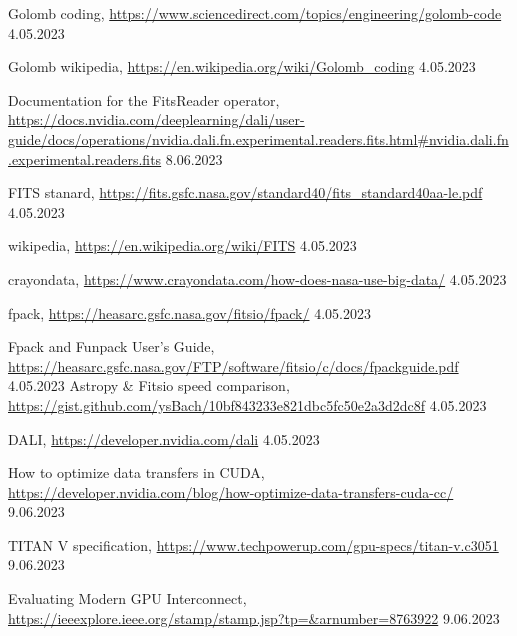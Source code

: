 \documentclass[licencjacka,en]{pracamgr}
\begin{document}
\begin{thebibliography}{99}
         {Golomb coding},
        \url{https://www.sciencedirect.com/topics/engineering/golomb-code} 4.05.2023

         {Golomb wikipedia},
        \url{https://en.wikipedia.org/wiki/Golomb_coding} 4.05.2023

        
         {Documentation for the FitsReader operator},
        \url{https://docs.nvidia.com/deeplearning/dali/user-guide/docs/operations/nvidia.dali.fn.experimental.readers.fits.html#nvidia.dali.fn.experimental.readers.fits} 8.06.2023
        

         {FITS stanard},
        \url{https://fits.gsfc.nasa.gov/standard40/fits_standard40aa-le.pdf} 4.05.2023

         {wikipedia},
        \url{https://en.wikipedia.org/wiki/FITS} 4.05.2023

         {crayondata},
        \url{https://www.crayondata.com/how-does-nasa-use-big-data/} 4.05.2023

         {fpack},
        \url{https://heasarc.gsfc.nasa.gov/fitsio/fpack/} 4.05.2023
        
         {Fpack and Funpack User's Guide},
        \url{https://heasarc.gsfc.nasa.gov/FTP/software/fitsio/c/docs/fpackguide.pdf} 4.05.2023 
         {Astropy \& Fitsio speed comparison},
        \url{https://gist.github.com/ysBach/10bf843233e821dbc5fc50e2a3d2dc8f} 4.05.2023 
        
         DALI,
        \url{https://developer.nvidia.com/dali} 4.05.2023

         How to optimize data transfers in CUDA,
        \url{https://developer.nvidia.com/blog/how-optimize-data-transfers-cuda-cc/} 9.06.2023

         TITAN V specification,
        \url{https://www.techpowerup.com/gpu-specs/titan-v.c3051} 9.06.2023    

        
        
         Evaluating Modern GPU Interconnect,
        \url{https://ieeexplore.ieee.org/stamp/stamp.jsp?tp=&arnumber=8763922} 9.06.2023


\end{thebibliography}
\end{document}
